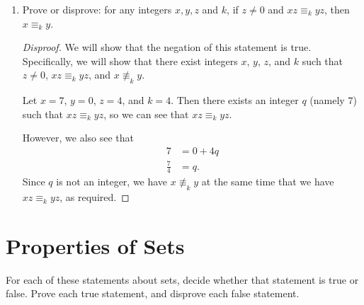 \documentclass{article}
\renewcommand{\(}{\left(}
\renewcommand{\)}{\right)}
\theoremstyle{plain}
\theoremstyle{plain}
\theoremstyle{definition}
\begin{document}
\begin{enumerate}[label*=\roman*.,ref=\roman*]
\begin{shaded}
\begin{proof}
	Since $x \equiv_k y$, we know that
	\begin{equation}
	x = y + kq
	\end{equation}
	for some integer $q$.
	
	Multiplying this equality by $z$, we learn that
	\begin{equation}
	xz = yz + kqz.
	\end{equation}
	
	So, there exists an integer $r$ (namely, $qz$) such that $xz = yz + kr$.
	
	Therefore, we have shown that $xz \equiv_k yz$, as required.
\end{proof}
\end{shaded}

\item Prove or disprove: for any integers $x, y, z$ and $k$, if $z \neq 0$ and $xz \equiv_k yz$, then $x \equiv_k y$.


\begin{shaded}

\begin{proof}[Disproof] We will show that the negation of this statement is true. Specifically, we will show that there exist integers $x$, $y$, $z$, and $k$ such that $z \neq 0$, $xz \equiv_k yz$, and $x \not\equiv_k y$.
	
	Let $x = 7$, $y = 0$, $z = 4$, and $k = 4$. Then there exists an integer $q$ (namely $7$) such that  $xz \equiv_k yz$, so we can see that $xz \equiv_k yz$.
	
	However, we also see that
	\begin{equation*}
	\begin{aligned}
	7 & = 0 + 4q \\
	\frac{7}{4} & = q.
	\end{aligned}
	\end{equation*}
	Since $q$ is not an integer, we have $x \not\equiv_k y$ at the same time that we have $xz \equiv_k yz$, as required.
\end{proof}	
\end{shaded}

\end{enumerate}

\pagebreak

\section{Properties of Sets}

For each of these statements about sets, decide whether that statement is true or false. Prove each true statement, and disprove each false statement. \\
\end{document}
